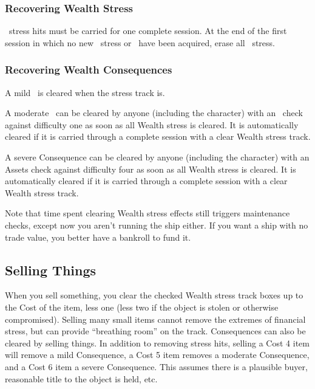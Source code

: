 \subsubsection{Recovering Wealth Stress}

\Wealth\ stress hits must be carried for one complete session. At the end of the first session in which no new \Wealth\ stress or \Consequences\ have been acquired, erase all \Wealth\ stress.

\subsubsection{Recovering Wealth Consequences}

A mild \Consequence\ is cleared when the stress track is.

A moderate \Consequence\ can be cleared by anyone (including the character) with an \Assets\ check against difficulty one as soon as all Wealth stress is cleared. It is automatically cleared if it is carried through a complete session with a clear Wealth stress track.

A severe Consequence can be cleared by anyone (including the character) with an Assets check against difficulty four as soon as all Wealth stress is cleared. It is automatically cleared if it is carried through a complete session with a clear Wealth stress track.

Note that time spent clearing Wealth stress effects still triggers maintenance checks, except now you aren't running the ship either. If you want a ship with no trade value, you better have a bankroll to fund it.


\subsection{Selling Things}\label{sec:Selling Things}

When you sell something, you clear the checked Wealth stress track boxes up to the Cost of the item, less one (less two if the object is stolen or otherwise compromised).  Selling many small items cannot remove the extremes of financial stress, but can provide ``breathing room'' on the track. Consequences can also be cleared by selling things. In addition to removing stress hits, selling a Cost 4 item will remove a mild Consequence, a Cost 5 item removes a moderate Consequence, and a Cost 6 item a severe Consequence. This assumes there is a plausible buyer, reasonable title to the object is held, etc.

